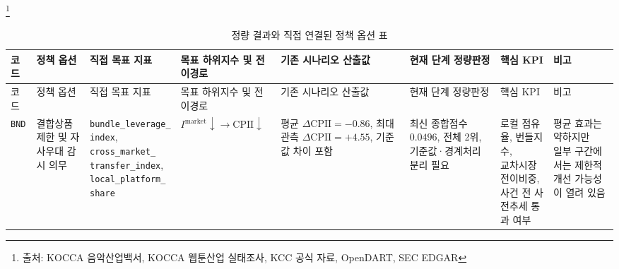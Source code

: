 \documentclass[11pt,a4paper]{report}
\newcommand{\sourcefootnote}[1]{\footnote{출처: #1}}
\begin{document}
\sourcefootnote{KOCCA 음악산업백서, KOCCA 웹툰산업 실태조사, KCC 공식 자료, OpenDART, SEC EDGAR}

\begin{landscape}
\scriptsize
\setlength{\tabcolsep}{2pt}
\begin{longtable}{@{}L{1.0cm}L{2.6cm}L{3.0cm}L{2.7cm}L{3.1cm}L{3.0cm}L{3.3cm}L{3.0cm}@{}}
\caption{정량 결과와 직접 연결된 정책 옵션 표}
\label{tab:policy_options}\\
\toprule
{}
코드 & 정책 옵션 & 직접 목표 지표 & 목표 하위지수 및 전이경로 & 기존 시나리오 산출값 & 현재 단계 정량판정 & 핵심 KPI & 비고 \\
\midrule
\endfirsthead
\toprule
{}
코드 & 정책 옵션 & 직접 목표 지표 & 목표 하위지수 및 전이경로 & 기존 시나리오 산출값 & 현재 단계 정량판정 & 핵심 KPI & 비고 \\
\midrule
\endhead
\texttt{BND} & 결합상품 제한 및 자사우대 감시 의무 & \parbox[t]{\linewidth}{\raggedright \texttt{bundle\_leverage\_}\\\texttt{index},\\\texttt{cross\_market\_}\\\texttt{transfer\_index},\\\texttt{local\_platform\_}\\\texttt{share}} & $I^{\mathrm{market}} \downarrow \rightarrow \mathrm{CPII}\downarrow$ & \parbox[t]{\linewidth}{\raggedright 평균 $\Delta \mathrm{CPII}=-0.86$,\\최대 관측 $\Delta \mathrm{CPII}=+4.55$,\\기준값 차이 포함} & \parbox[t]{\linewidth}{\raggedright 최신 종합점수 $0.0496$,\\전체 2위,\\기준값·경계처리 분리 필요} & \parbox[t]{\linewidth}{\raggedright 로컬 점유율, 번들지수,\\교차시장 전이비중,\\사건 전 사전추세 통과 여부} & \parbox[t]{\linewidth}{\raggedright 평균 효과는 약하지만\\일부 구간에서는 제한적 개선 가능성이 열려 있음} \\

\end{longtable}
\end{landscape}
\end{document}
